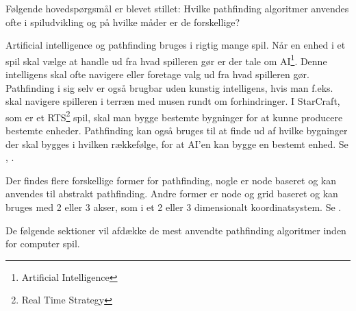 
Følgende hovedspørgsmål er blevet stillet:
Hvilke pathfinding algoritmer anvendes ofte i spiludvikling og på hvilke måder er de forskellige?

Artificial intelligence og pathfinding bruges i rigtig mange spil. Når en enhed i et spil skal vælge at handle ud fra hvad spilleren gør er der tale om AI\footnote{Artificial Intelligence}. Denne intelligens skal ofte navigere eller foretage valg ud fra hvad spilleren gør. Pathfinding i sig selv er også brugbar uden kunstig intelligens, hvis man f.eks. skal navigere spilleren i terræn med musen rundt om forhindringer. I StarCraft, som er et RTS\footnote{Real Time Strategy} spil, skal man bygge bestemte bygninger for at kunne producere bestemte enheder. Pathfinding kan også bruges til at finde ud af hvilke bygninger der skal bygges i hvilken rækkefølge, for at AI'en kan bygge en bestemt enhed. Se \textcite[193]{buckland}, \textcite[198]{MillingtonFunge}. 

Der findes flere forskellige former for pathfinding, nogle er node baseret og kan anvendes til abstrakt pathfinding. Andre former er node og grid baseret og kan bruges med 2 eller 3 akser, som i et 2 eller 3 dimensionalt koordinatsystem. Se \textcite[193-203]{buckland}.

De følgende sektioner vil afdække de mest anvendte pathfinding algoritmer inden for computer spil.












